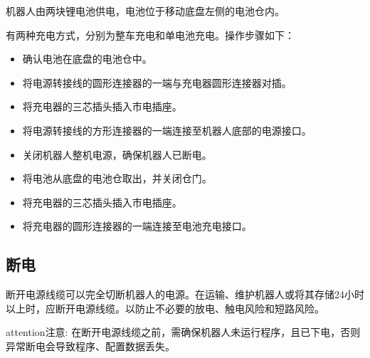 \documentclass[a4paper,11pt,english,openany,oneside]{sphinxmanual}
\begin{document}
\sphinxAtStartPar
机器人由两块锂电池供电，电池位于移动底盘左侧的电池仓内。

\sphinxAtStartPar
有两种充电方式，分别为整车充电和单电池充电。操作步骤如下：

\sphinxAtStartPar
{}
\begin{itemize}
\item {} 
\sphinxAtStartPar
确认电池在底盘的电池仓中。

\item {} 
\sphinxAtStartPar
将电源转接线的圆形连接器的一端与充电器圆形连接器对插。

\item {} 
\sphinxAtStartPar
将充电器的三芯插头插入市电插座。

\item {} 
\sphinxAtStartPar
将电源转接线的方形连接器的一端连接至机器人底部的电源接口。

\end{itemize}

\sphinxAtStartPar
{}
\begin{itemize}
\item {} 
\sphinxAtStartPar
关闭机器人整机电源，确保机器人已断电。

\item {} 
\sphinxAtStartPar
将电池从底盘的电池仓取出，并关闭仓门。

\item {} 
\sphinxAtStartPar
将充电器的三芯插头插入市电插座。

\item {} 
\sphinxAtStartPar
将充电器的圆形连接器的一端连接至电池充电接口。

\end{itemize}


\subsection{断电}
\label{\detokenize{08 _u5b89_u88c5_u4e0e_u8c03_u8bd5:id27}}\label{\detokenize{08 _u5b89_u88c5_u4e0e_u8c03_u8bd5:id28}}
\sphinxAtStartPar
断开电源线缆可以完全切断机器人的电源。在运输、维护机器人或将其存储24小时以上时，应断开电源线缆。以防止不必要的放电、触电风险和短路风险。

\begin{sphinxadmonition}{attention}{注意:}
\sphinxAtStartPar
在断开电源线缆之前，需确保机器人未运行程序，且已下电，否则异常断电会导致程序、配置数据丢失。
\end{sphinxadmonition}
\end{document}

